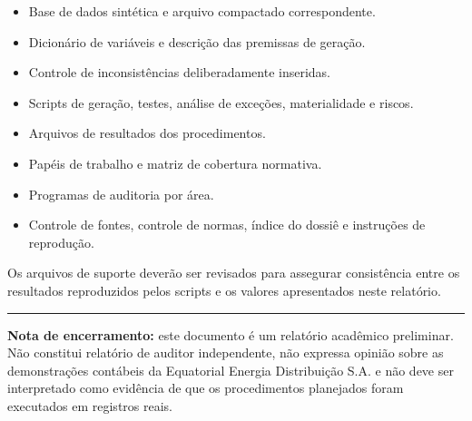 \documentclass[
]{article}
\providecommand{\tightlist}{%
  \setlength{\itemsep}{0pt}\setlength{\parskip}{0pt}}
\begin{document}
\begin{itemize}
\tightlist
\item
  Base de dados sintética e arquivo compactado correspondente.
\item
  Dicionário de variáveis e descrição das premissas de geração.
\item
  Controle de inconsistências deliberadamente inseridas.
\item
  Scripts de geração, testes, análise de exceções, materialidade e
  riscos.
\item
  Arquivos de resultados dos procedimentos.
\item
  Papéis de trabalho e matriz de cobertura normativa.
\item
  Programas de auditoria por área.
\item
  Controle de fontes, controle de normas, índice do dossiê e instruções
  de reprodução.
\end{itemize}

Os arquivos de suporte deverão ser revisados para assegurar consistência
entre os resultados reproduzidos pelos scripts e os valores apresentados
neste relatório.

\begin{center}\rule{0.5\linewidth}{0.5pt}\end{center}

\textbf{Nota de encerramento:} este documento é um relatório acadêmico
preliminar. Não constitui relatório de auditor independente, não
expressa opinião sobre as demonstrações contábeis da Equatorial Energia
Distribuição S.A. e não deve ser interpretado como evidência de que os
procedimentos planejados foram executados em registros reais.
\end{document}
